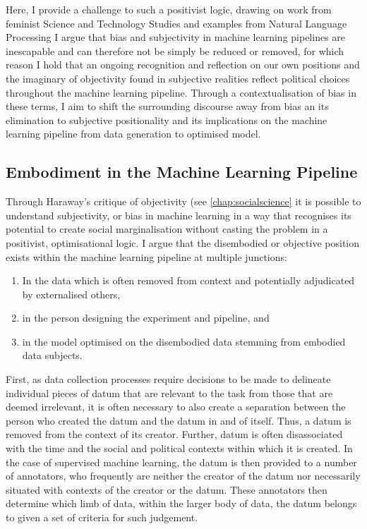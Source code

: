 Here, I provide a challenge to such a positivist logic, drawing on work from feminist Science and Technology Studies and examples from Natural Language Processing I argue that bias and subjectivity in machine learning pipelines are inescapable and can therefore not be simply be reduced or removed, for which reason I hold that an ongoing recognition and reflection on our own positions and the imaginary of objectivity found in subjective realities reflect political choices throughout the machine learning pipeline. Through a contextualisation of bias in these terms, I aim to shift the surrounding discourse away from bias an its elimination to subjective positionality and its implications on the machine learning pipeline from data generation to optimised model.

\subsection{Embodiment in the Machine Learning Pipeline}
Through Haraway's \citeyearpar{Haraway:1988} critique of objectivity (see \cref{chap:socialscience} it is possible to understand subjectivity, or bias in machine learning in a way that recognises its potential to create social marginalisation without casting the problem in a positivist, optimisational logic. I argue that the disembodied or objective position exists within the machine learning pipeline at multiple junctions:
\begin{enumerate}
  \item{In the data which is often removed from context and potentially adjudicated by externalised others,}
  \item{in the person designing the experiment and pipeline, and}
  \item{in the model optimised on the disembodied data stemming from embodied data subjects.}
\end{enumerate}
First, as data collection processes require decisions to be made to delineate individual pieces of datum that are relevant to the task from those that are deemed irrelevant, it is often necessary to also create a separation between the person who created the datum and the datum in and of itself. Thus, a datum is removed from the context of its creator. Further, datum is often disassociated with the time and the social and political contexts within which it is created. In the case of supervised machine learning, the datum is then provided to a number of annotators, who frequently are neither the creator of the datum nor necessarily situated with contexts of the creator or the datum. These annotators then determine which limb of data, within the larger body of data, the datum belongs to given a set of criteria for such judgement.
